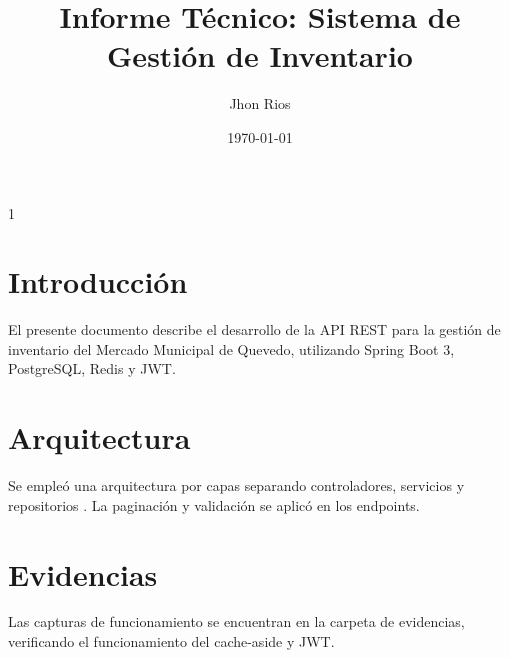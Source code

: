 1\documentclass[12pt,a4paper]{article}
\title{Informe Técnico: Sistema de Gestión de Inventario}
\author{Jhon Rios}
\date{\today}
\begin{document}
\maketitle

\section{Introducción}
El presente documento describe el desarrollo de la API REST para la gestión de inventario del Mercado Municipal de Quevedo, utilizando Spring Boot 3, PostgreSQL, Redis y JWT.

\section{Arquitectura}
Se empleó una arquitectura por capas separando controladores, servicios y repositorios \cite{martin2017clean}. La paginación y validación se aplicó en los endpoints.

\section{Evidencias}
Las capturas de funcionamiento se encuentran en la carpeta de evidencias, verificando el funcionamiento del cache-aside \cite{kleppmann2017design} y JWT.



\end{document}
